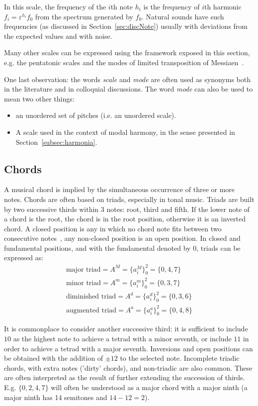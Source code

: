 \documentclass[format=acmsmall, review=false, screen=true]{acmart}
\begin{document}
In this scale, the frequency of the $i$th note $h_i$ is the frequency of $i$th harmonic $f_i=\varepsilon^{h_i} f_0$ from the spectrum generated by $f_0$. Natural sounds have such frequencies (as discussed in Section~\ref{sec:discNote}) usually with deviations from the expected values and with noise.

Many other scales can be expressed using the framework exposed in this section, e.g. the pentatonic scales and the modes of limited transposition of Messiaen~\cite{Messiaen}.

One last observation: the words \emph{scale} and \emph{mode} are often used as synonyms both in the literature and in colloquial discussions.
The word \emph{mode} can also be used to mean two other things:
\begin{itemize}
	\item an unordered set of pitches (i.e. an unordered scale).
	\item A scale used in the context of modal harmony, in the sense presented in Section~\ref{subsec:harmonia}.
\end{itemize}

\subsection{Chords}\label{subsec:acordes}
A musical chord is implied by the simultaneous occurrence of three or more notes. Chords are often based on triads, especially in tonal music. Triads are built by two successive thirds
within 3 notes: root, third and fifth. If the lower note of a chord is the root, the chord is in the root position, otherwise it is an inverted chord. A closed position is any in which no chord note fits between two consecutive
notes~\cite{Lacerda}, any non-closed position is an open position. In closed and fundamental positions,
and with the fundamental denoted by $0$, triads can be expressed as:
\begin{equation}\label{triades}
\begin{split}
\text{major triad} = A^M= \{a_i^M\}_0^2=\{0,4,7\} \\ 
\text{minor triad} = A^m = \{a_i^m\}_0^2=\{0,3,7\} \\
\text{diminished triad} = A^d = \{a_i^d\}_0^2=\{0,3,6\} \\
\text{augmented triad} = A^a = \{a_i^a\}_0^2=\{0,4,8\}
\end{split}
\end{equation}

It is commonplace to consider another successive third: it is sufficient to include $10$ as the highest note to achieve a tetrad with a minor seventh, or include $11$ in order to achieve a tetrad with a major
seventh. Inversions and open positions can be obtained with the 
addition of $\pm 12$ to the selected note. Incomplete triadic chords, with extra notes ('dirty' chords), and non-triadic
are also common.
These are often interpreted as the result of further extending the succession of thirds.
E.g. $\{0,2,4,7\}$ will often be understood as a major chord with a major ninth (a major ninth has 14 semitones and $14-12 = 2$).
\end{document}
